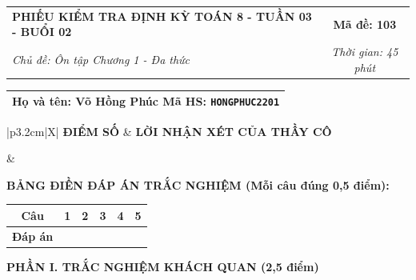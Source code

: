 \documentclass[12pt,a4paper]{article}
\begin{document}
\newpage


\noindent
\begin{tabularx}{\linewidth}{|X|c|}
\hline
\textbf{PHIẾU KIỂM TRA ĐỊNH KỲ TOÁN 8 - TUẦN 03 - BUỔI 02} & \textbf{Mã đề: 103} \\
\textit{Chủ đề: Ôn tập Chương 1 - Đa thức} & \textit{Thời gian: 45 phút} \\
\hline
\end{tabularx}

\vspace{1mm}

\noindent
\begin{tabularx}{\linewidth}{|X|}
\hline
\rule[-2mm]{0pt}{7.5mm}\textbf{Họ và tên:} \textbf{\large Võ Hồng Phúc} \hfill \textbf{Mã HS:} \texttt{HONGPHUC2201} \quad \\
\hline
\end{tabularx}

\vspace{1mm}

\noindent
\begin{tabularx}{\linewidth}{|p{3.2cm}|X|}
\hline
\centering\textbf{ĐIỂM SỐ} & \centering\textbf{LỜI NHẬN XÉT CỦA THẦY CÔ} \tabularnewline
\hline
\rule{0pt}{1.3cm} & \tabularnewline
\hline
\end{tabularx}

\vspace{1.2mm}

\noindent\textbf{BẢNG ĐIỀN ĐÁP ÁN TRẮC NGHIỆM (Mỗi câu đúng 0,5 điểm):}
\vspace{0.8mm}

\noindent
\renewcommand{\arraystretch}{1.35}
\begin{tabularx}{\linewidth}{|c|*{5}{>{\centering\arraybackslash}X|}}
\hline
\textbf{Câu} & \textbf{1} & \textbf{2} & \textbf{3} & \textbf{4} & \textbf{5} \\
\hline
\textbf{Đáp án} & & & & & \\
\hline
\end{tabularx}
\renewcommand{\arraystretch}{1.0}

\vspace{1.5mm}

\noindent\textbf{\large PHẦN I. TRẮC NGHIỆM KHÁCH QUAN (2,5 điểm)}
\vspace{1mm}
\end{document}
